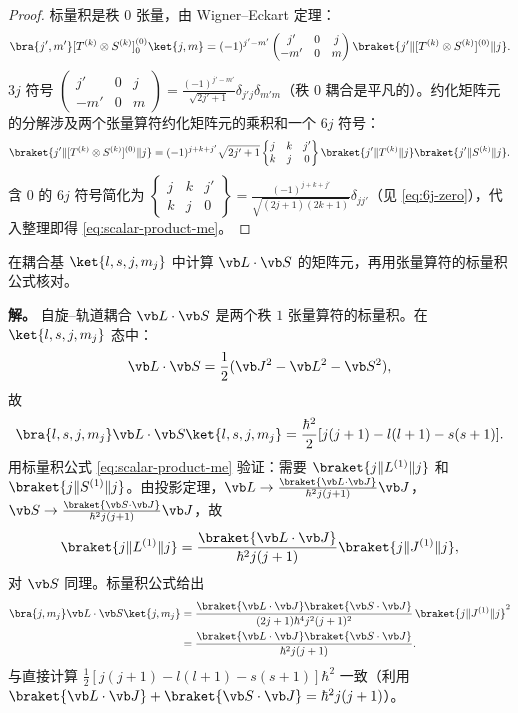 \begin{proof}
标量积是秩 $0$ 张量，由 Wigner--Eckart 定理：
\[
\bra{j',m'}[T^{(k)}\otimes S^{(k)}]^{(0)}_0\ket{j,m}
=(-1)^{j'-m'}\begin{pmatrix}j'&0&j\\-m'&0&m\end{pmatrix}\braket{j'\|[T^{(k)}\otimes S^{(k)}]^{(0)}\|j}.
\]
$3j$ 符号 $\begin{pmatrix}j'&0&j\\-m'&0&m\end{pmatrix}=\frac{(-1)^{j'-m'}}{\sqrt{2j'+1}}\delta_{j'j}\delta_{m'm}$（秩 $0$ 耦合是平凡的）。约化矩阵元的分解涉及两个张量算符约化矩阵元的乘积和一个 $6j$ 符号：
\[
\braket{j'\|[T^{(k)}\otimes S^{(k)}]^{(0)}\|j}
=(-1)^{j+k+j'}\sqrt{2j'+1}\begin{Bmatrix}j&k&j'\\k&j&0\end{Bmatrix}\braket{j'\|T^{(k)}\|j}\braket{j'\|S^{(k)}\|j}.
\]
含 $0$ 的 $6j$ 符号简化为 $\begin{Bmatrix}j&k&j'\\k&j&0\end{Bmatrix}=\frac{(-1)^{j+k+j'}}{\sqrt{(2j+1)(2k+1)}}\delta_{jj'}$（见 \cref{eq:6j-zero}），代入整理即得 \cref{eq:scalar-product-me}。
\end{proof}
\begin{example}[{自旋--轨道耦合的矩阵元}]
在耦合基 $\ket{l,s,j,m_j}$ 中计算 $\vb L\cdot\vb S$ 的矩阵元，再用张量算符的标量积公式核对。

\textbf{解。} 自旋--轨道耦合 $\vb L\cdot\vb S$ 是两个秩 $1$ 张量算符的标量积。在 $\ket{l,s,j,m_j}$ 态中：
\[
\vb L\cdot\vb S=\frac12(\vb J^2-\vb L^2-\vb S^2),
\]
故
\[
\bra{l,s,j,m_j}\vb L\cdot\vb S\ket{l,s,j,m_j}
=\frac{\hbar^2}{2}[j(j+1)-l(l+1)-s(s+1)].
\]
用标量积公式 \cref{eq:scalar-product-me} 验证：需要 $\braket{j\|L^{(1)}\|j}$ 和 $\braket{j\|S^{(1)}\|j}$。由投影定理，$\vb L\to\frac{\braket{\vb L\cdot\vb J}}{\hbar^2 j(j+1)}\vb J$，$\vb S\to\frac{\braket{\vb S\cdot\vb J}}{\hbar^2 j(j+1)}\vb J$，故
\[
\braket{j\|L^{(1)}\|j}=\frac{\braket{\vb L\cdot\vb J}}{\hbar^2 j(j+1)}\braket{j\|J^{(1)}\|j},
\]
对 $\vb S$ 同理。标量积公式给出
\[
\begin{aligned}
\bra{j,m_j}\vb L\cdot\vb S\ket{j,m_j}
&=\frac{\braket{\vb L\cdot\vb J}\braket{\vb S\cdot\vb J}}
{(2j+1)\hbar^4j^2(j+1)^2}\,
\braket{j\|J^{(1)}\|j}^2\\
&=\frac{\braket{\vb L\cdot\vb J}\braket{\vb S\cdot\vb J}}
{\hbar^2j(j+1)}.
\end{aligned}
\]
与直接计算 $\frac12[j(j+1)-l(l+1)-s(s+1)]\hbar^2$ 一致（利用 $\braket{\vb L\cdot\vb J}+\braket{\vb S\cdot\vb J}=\hbar^2 j(j+1)$）。
\end{example}
